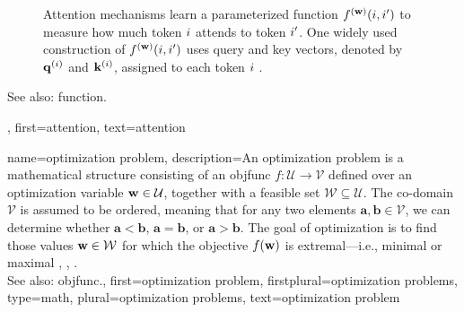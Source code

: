 {{\begin{figure}[H]
			\caption{Attention mechanisms learn a parameterized \gls{function} $f^{({\bf w})}(i,i')$ to measure 
				how much token $i$ attends to token $i'$. One widely used construction of $f^{({\bf w})}(i,i')$ 
				uses query and key \glspl{vector}, denoted by ${\bf q}^{(i)}$ and ${\bf k}^{(i)}$, assigned to each 
				token $i$ \cite{vaswani2017attention}. \label{fig_attention_dict}}
		\end{figure}
		See also: \gls{function}.},
	first={attention},
	text={attention}
}


{name={optimization problem}, 
	description={An optimization problem is a mathematical 
		   structure consisting of an \gls{objfunc} $f: \mathcal{U} \rightarrow \mathcal{V}$ 
		   defined over an optimization variable ${\bf w} \in \mathcal{U}$, together with a 
		   feasible set $\mathcal{W} \subseteq \mathcal{U}$. The co-domain $\mathcal{V}$ is 
		   assumed to be ordered, meaning that for any two elements $\mathbf{a}, \mathbf{b} \in \mathcal{V}$, 
		   we can determine whether $\mathbf{a} < \mathbf{b}$, $\mathbf{a} = \mathbf{b}$, 
		   or $\mathbf{a} > \mathbf{b}$. The goal of optimization is to find those values ${\bf w} \in \mathcal{W}$ 
		   for which the objective $f({\bf w})$ is extremal—i.e., minimal or maximal \cite{BoydConvexBook}, \cite{BertsekasNonLinProgr}, \cite{nesterov04}.
		   \\
		   See also: \gls{objfunc}.},
	first={optimization problem},
	firstplural={optimization problems}, 
	type=math,
	plural={optimization problems}, 
	text={optimization problem}
}


